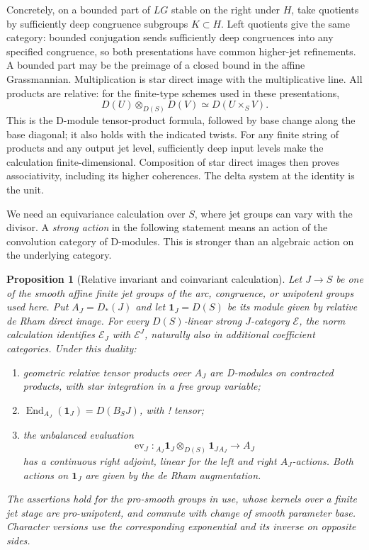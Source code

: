 \documentclass[11pt]{article}
\numberwithin{equation}{section}
\newtheorem{proposition}[theorem]{Proposition}
\theoremstyle{definition}
\theoremstyle{remark}
\begin{document}
Concretely, on a bounded part of $LG$ stable on the right under $H$, take
quotients by sufficiently deep congruence subgroups $K\subset H$.  Left
quotients give the same category: bounded conjugation sends sufficiently
deep congruences into any specified congruence, so both presentations
have common higher-jet refinements.  A bounded part may be the preimage
of a closed bound in the affine Grassmannian.  Multiplication is star
direct image with the multiplicative line.  All products are relative:
for the finite-type schemes used in these presentations,
\[
                 D(U)\otimes_{D(S)}D(V)
                       \simeq D(U\times_S V).
\]
This is the D-module tensor-product formula, followed by base change
along the base diagonal; it also holds with the indicated twists.
For any finite string of products and any output jet level, sufficiently
deep input levels make the calculation finite-dimensional.  Composition
of star direct images then proves associativity, including its higher
coherences.  The delta system at the identity is the unit.

We need an equivariance calculation over $S$, where jet groups can vary
with the divisor.  A \emph{strong action} in the following statement
means an action of the convolution category of D-modules.  This is
stronger than an algebraic action on the underlying category.

\begin{proposition}[Relative invariant and coinvariant calculation]
\label{loop:relative-equivariance}
Let $J\to S$ be one of the smooth affine finite jet groups of the arc,
congruence, or unipotent groups used here.  Put
$A_J=D_*(J)$ and let $\mathbf1_J=D(S)$ be its module given by relative
de Rham direct image.  For every $D(S)$-linear strong $J$-category
$\mathcal E$, the norm calculation identifies
$\mathcal E_J$ with $\mathcal E^J$, naturally also in additional
coefficient categories.  Under this duality:
\begin{enumerate}
\item geometric relative tensor products over $A_J$ are D-modules on
contracted products, with star integration in a free group variable;
\item $\operatorname{End}_{A_J}(\mathbf1_J)=D(B_SJ)$, with ! tensor;
\item the unbalanced evaluation
\[
 \operatorname{ev}_J:
 {}_{A_J}\mathbf1_J\otimes_{D(S)}\mathbf1_J{}_{A_J}
       \longrightarrow A_J
\]
has a continuous right adjoint, linear for the left and right
$A_J$-actions.  Both actions on $\mathbf1_J$ are given by the
de Rham augmentation.
\end{enumerate}
The assertions hold for the pro-smooth groups in use, whose kernels
over a finite jet stage are pro-unipotent, and commute with change of
smooth parameter base.  Character versions use the corresponding
exponential and its inverse on opposite sides.
\end{proposition}
\end{document}
